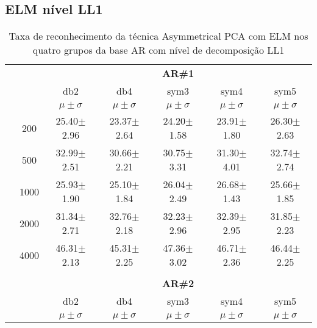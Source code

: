 \subsection{ELM nível LL1}


\begin{table}[H]
	\centering
    \normalsize
	\caption{Taxa de reconhecimento da técnica Asymmetrical PCA com ELM nos quatro grupos da base AR com nível de decomposição LL1}
	\begin{tabular}{|c|c|c c c c c|}
\cline{3-7}
\multicolumn{2}{c|}{\multirow{3}{*}{}} & \multicolumn{5}{c|}{\textbf{AR\#1}}   \\\cline{3-7} 
\multicolumn{2}{c|}{}  & db2 & db4 & sym3 & sym4 & sym5 \\\cline{3-7}%
\multicolumn{2}{c|}{}& $\mu \pm \sigma$ & $\mu \pm \sigma$ & $\mu \pm \sigma$ & $\mu \pm \sigma$ & $\mu \pm \sigma$ \\\cline{2-7}
\multicolumn{1}{|c|}{ \multirow{5}{*}{\rotatebox[origin=c]{90}{\textbf{Neurônios}}} }
&200	&25.40$\pm$2.96	&23.37$\pm$2.64	&24.20$\pm$1.58	&23.91$\pm$1.80	&26.30$\pm$2.63\\\cline{2-7}
&500	&32.99$\pm$2.51	&30.66$\pm$2.21	&30.75$\pm$3.31	&31.30$\pm$4.01	&32.74$\pm$2.74\\\cline{2-7}
&1000	&25.93$\pm$1.90	&25.10$\pm$1.84	&26.04$\pm$2.49	&26.68$\pm$1.43	&25.66$\pm$1.85\\\cline{2-7}
&2000	&31.34$\pm$2.71	&32.76$\pm$2.18	&32.23$\pm$2.96	&32.39$\pm$2.95	&31.85$\pm$2.23\\\cline{2-7}
&4000	&46.31$\pm$2.13	&45.31$\pm$2.25	&47.36$\pm$3.02	&46.71$\pm$2.36	&46.44$\pm$2.25



\\\midrule%

\multicolumn{7}{c}{}\\ 

\cline{3-7}
\multicolumn{2}{c|}{\multirow{3}{*}{}} & \multicolumn{5}{c|}{\textbf{AR\#2}}   \\\cline{3-7} 

\multicolumn{2}{c|}{}  & db2 & db4 & sym3 & sym4 & sym5 \\\cline{3-7}
\multicolumn{2}{c|}{}& $\mu \pm \sigma$ & $\mu \pm \sigma$ & $\mu \pm \sigma$ & $\mu \pm \sigma$ & $\mu \pm \sigma$ \\\hline



\end{tabular}
\end{table}
